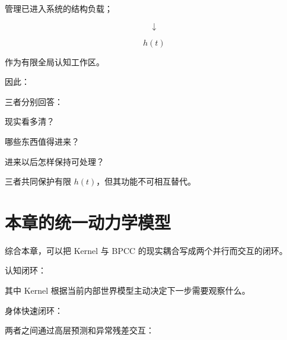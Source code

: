 管理已进入系统的结构负载；

\[
\downarrow
\]

\[
\boxed{
h(t)
}
\]

作为有限全局认知工作区。

因此：

\begin{statementbox}
\centering
{}
\end{statementbox}

三者分别回答：

\begin{statementbox}
现实看多清？
\end{statementbox}

\begin{statementbox}
哪些东西值得进来？
\end{statementbox}

\begin{statementbox}
进来以后怎样保持可处理？
\end{statementbox}

三者共同保护有限 $h(t)$，但其功能不可相互替代。

\section{本章的统一动力学模型}

综合本章，可以把 Kernel 与 BPCC 的现实耦合写成两个并行而交互的闭环。

认知闭环：

\begin{statementbox}
\centering
{}
\end{statementbox}

其中 Kernel 根据当前内部世界模型主动决定下一步需要观察什么。

身体快速闭环：

\begin{statementbox}
\centering
{}
\end{statementbox}

两者之间通过高层预测和异常残差交互：

